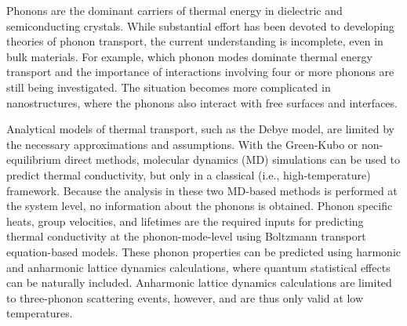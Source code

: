 \documentclass[12pt,twocolumn,iop]{/usr/share/texmf-texlive/tex/latex/iop/iopart}[/usr/share/texmf-texlive/tex/latex/iop/]
\begin{document}
Phonons are the dominant carriers of thermal energy in dielectric
and semiconducting crystals.\cite{cahill2003,goodson2005,srivastava1990,wallace1972,maradudin1974,dove1993} While
substantial effort has been devoted to developing theories of phonon
transport, the current understanding is incomplete, even in bulk materials. For
example, which phonon modes dominate thermal energy transport and the importance of
interactions involving four or more phonons are still being investigated.\cite{wallace1972,srivastava1990,broido2007,esfarjani2011,cahill2003}  The
situation becomes more complicated in nanostructures, where the phonons also interact with free surfaces and interfaces.\cite{asheghi1997,balandin1997,li1997,tian2011,Hochbaum2011,Martin2011,Yu2011,Hopkins2011,landry2008,mcgaughey2011a,landry2009,landry2009b,landry2010}

Analytical models of thermal transport, such as the Debye model, are limited by
the necessary approximations and assumptions.\cite{callaway1959,holland1963,mcgaughey2011a} With the Green-Kubo or
non-equilibrium direct methods, molecular dynamics (MD) simulations can be used to predict thermal
conductivity, but only in a classical (i.e., high-temperature) framework.\cite{ladd1986,mcgaughey2004c,landry2008,schelling2002,sellan2010a,esfarjani2011,turney2009a} Because the analysis in these two MD-based methods is performed at the system level, no information about the phonons is obtained. Phonon specific heats, group velocities, and lifetimes are the required inputs for predicting thermal conductivity at the phonon-mode-level using  Boltzmann transport equation-based models.\cite{ladd1986,mcgaughey2004c,mcgaughey2011a,sellan2010b,esfarjani2011,turney2009a,He2011}
These phonon properties can be predicted using harmonic and anharmonic lattice dynamics
calculations,\cite{maradudin1962,wallace1972,ladd1986,dove1993,turney2009a,turney2009b} where quantum statistical effects can be naturally included. Anharmonic lattice dynamics calculations are limited to three-phonon scattering events, however, and are thus only valid at low temperatures.\cite{turney2009a,esfarjani2011,wallace1972,srivastava1990}
\end{document}
